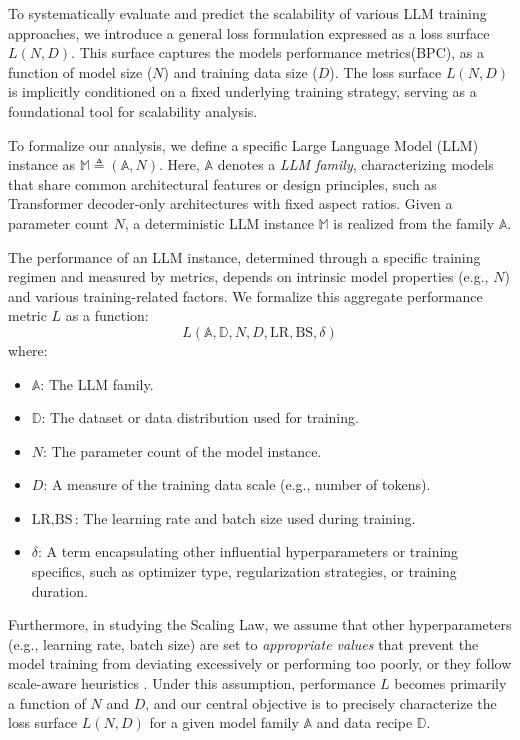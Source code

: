\documentclass{article}
\begin{document}
To systematically evaluate and predict the scalability of various LLM training approaches, we introduce a general loss formulation expressed as a loss surface $L(N, D)$. This surface captures the models performance metrics(BPC), as a function of model size ($N$) and training data size ($D$). The loss surface $L(N, D)$ is implicitly conditioned on a fixed underlying training strategy, serving as a foundational tool for scalability analysis.

To formalize our analysis, we define a specific Large Language Model (LLM) instance as $\mathbb{M} \triangleq (\mathbb{A}, N)$.
Here, $\mathbb{A}$ denotes a \textit{LLM family}, characterizing models that share common architectural features or design principles, such as Transformer decoder-only architectures with fixed aspect ratios. Given a parameter count $N$, a deterministic LLM instance $\mathbb{M}$ is realized from the family $\mathbb{A}$.

The performance of an LLM instance, determined through a specific training regimen and measured by metrics, depends on intrinsic model properties (e.g., $N$) and various training-related factors. We formalize this aggregate performance metric $L$ as a function:
\begin{equation}
\label{eq:performance_L}
L(\mathbb{A}, \mathbb{D}, N, D, \text{LR}, \text{BS}, \delta)
\end{equation}
where:
\begin{itemize}
    \item $\mathbb{A}$: The LLM family.
    \item $\mathbb{D}$: The dataset or data distribution used for training.
    \item $N$: The parameter count of the model instance.
    \item $D$: A measure of the training data scale (e.g., number of tokens).
    \item $\text{LR}, \text{BS}$: The learning rate and batch size used during training.
    \item $\delta$: A term encapsulating other influential hyperparameters or training specifics, such as optimizer type, regularization strategies, or training duration.
\end{itemize}

Furthermore, in studying the Scaling Law, we assume that other hyperparameters (e.g., learning rate, batch size) are set to \textit{appropriate values} that prevent the model training from deviating excessively or performing too poorly, or they follow scale-aware heuristics \cite{Yang2022,li2025predictable}. Under this assumption, performance $L$ becomes primarily a function of $N$ and $D$, and our central objective is to precisely characterize the loss surface $L(N, D)$ for a given model family $\mathbb{A}$ and data recipe $\mathbb{D}$.
\end{document}
